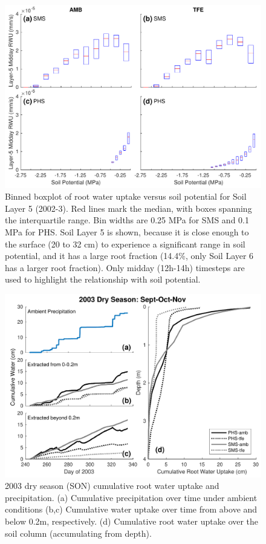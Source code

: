 \documentclass[draft,linenumbers]{agujournal}
\begin{document}
  \begin{figure}[h]
     \centering
     \includegraphics[width=30pc]{../figs3/rwu.pdf}
     \caption{Binned boxplot of root water uptake versus soil potential for Soil Layer 5 (2002-3).
     Red lines mark the median, with boxes spanning the interquartile range.
     Bin widths are 0.25 MPa for SMS and 0.1 MPa for PHS.
     Soil Layer 5 is shown, because it is close enough to the surface (20 to 32 cm) to experience a significant range in soil potential, and it has a large root fraction (14.4\%, only Soil Layer 6 has a larger root fraction).
     Only midday (12h-14h) timesteps are used to highlight the relationship with soil potential.}
     \label{fig:rwu}
  \end{figure}
  \clearpage

        \clearpage
    \begin{figure}[h]
     \centering
     \includegraphics[width=30pc]{../figs3/qdry.pdf}
     \caption{2003 dry season (SON) cumulative root water uptake and precipitation. 
     (a) Cumulative precipitation over time under ambient conditions
     (b,c) Cumulative water uptake over time from above and below 0.2m, respectively.
     (d) Cumulative root water uptake over the soil column (accumulating from depth).
     }
     \label{fig:qdry}
  \end{figure}
               
\end{document}
